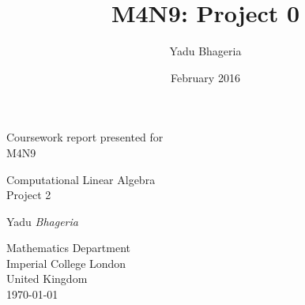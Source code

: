 \documentclass{article}
\title{M4N9: Project 0}
\author{Yadu Bhageria}
\date{February 2016}
\begin{document}
\lstset{language=Matlab}

\begin{titlepage}
    \begin{center}
    
        Coursework report presented for\\
        M4N9
        
        \vfill
        
        {\Huge Computational Linear Algebra\\ Project 2}
        
        
        \vspace{0.5cm}
        
        \vspace{1.5cm}
        
        {\Large Yadu \emph{Bhageria}}
        
        \vfill
        
        Mathematics Department\\
        Imperial College London\\
        United Kingdom\\
        \today
        
    \end{center}
\end{titlepage}
\end{document}
